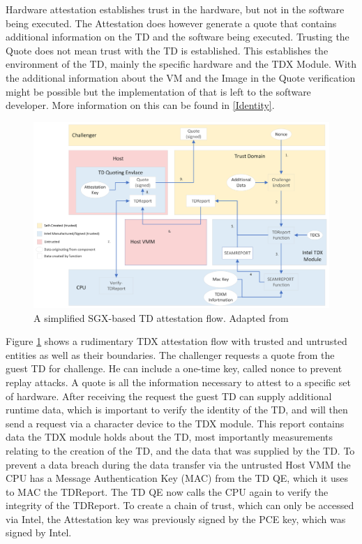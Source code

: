 Hardware attestation establishes trust in the hardware, but not in the software being executed. The Attestation does however generate a quote that contains additional information on the TD and the software being executed. Trusting the Quote does not mean trust with the TD is established. This establishes the environment of the TD, mainly the specific hardware and the TDX Module. With the additional information about the VM and the Image in the Quote verification might be possible but the implementation of that is left to the software developer. More information on this can be found in \cref{Identity}.
\begin{figure}
\centering
\includegraphics[width=\textwidth]{figures/Attestation-einfach.png}
\caption{A simplified \Gls{SGX}-based TD attestation flow. Adapted from \cite[p.~111]{noauthor_tdx-module-10-public-specpdf_nodate}}
\label{fig:EasyAttestation}
\end{figure}
Figure \ref{fig:EasyAttestation} shows a rudimentary TDX attestation flow with trusted and untrusted entities as well as their boundaries. The challenger requests a quote from the guest TD for challenge. He can include a one-time key, called nonce to prevent replay attacks. A quote is all the information necessary to attest to a specific set of hardware. After receiving the request the guest TD can supply additional runtime data, which is important to verify the identity of the TD, and will then send a request via a character device to the TDX module. This report contains data the TDX module holds about the TD, most importantly measurements relating to the creation of the TD, and the data that was supplied by the TD. To prevent a data breach during the data transfer via the untrusted Host VMM the CPU has a Message Authentication Key (MAC) from the TD QE, which it uses to MAC the TDReport. The TD QE now calls the CPU again to verify the integrity of the TDReport.
To create a chain of trust, which can only be accessed via Intel, the Attestation key was previously signed by the PCE key, which was signed by Intel. 

